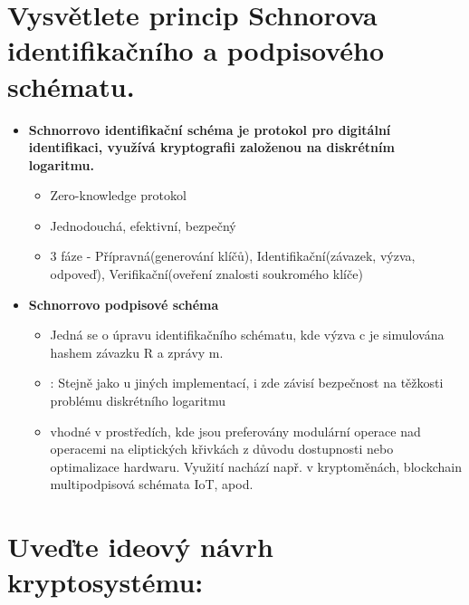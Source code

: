 \section{Vysvětlete princip Schnorova identifikačního a podpisového schématu.}
\begin{itemize}
    \item \textbf{Schnorrovo identifikační schéma je protokol pro digitální identifikaci, využívá kryptografii založenou na diskrétním logaritmu.}
    \begin{itemize}
        \item Zero-knowledge protokol
        \item Jednodouchá, efektivní, bezpečný
        \item 3 fáze - Přípravná(generování klíčů), Identifikační(závazek, výzva, odpoveď), Verifikační(oveření znalosti soukromého klíče)
    \end{itemize}
    \item \textbf{Schnorrovo podpisové schéma}
    \begin{itemize}
        \item Jedná se o úpravu identifikačního schématu, kde výzva c je simulována hashem závazku R a zprávy m.
        \item : Stejně jako u jiných implementací, i zde závisí bezpečnost na těžkosti problému diskrétního logaritmu
        \item vhodné v prostředích, kde jsou preferovány modulární operace nad operacemi na eliptických křivkách z
        důvodu dostupnosti nebo optimalizace hardwaru. Využití nachází např. v kryptoměnách, blockchain multipodpisová schémata IoT, apod.
    \end{itemize}
\end{itemize}


\section{Uveďte ideový návrh kryptosystému:}
